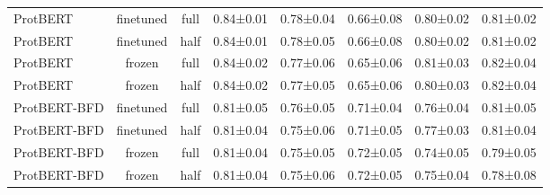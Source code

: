 \begin{tabular}{lccccccc}
    ProtBERT &      finetuned &      full & 0.84±0.01 & 0.78±0.04 & 0.66±0.08 & 0.80±0.02 & 0.81±0.02 \\
    ProtBERT &      finetuned &      half & 0.84±0.01 & 0.78±0.05 & 0.66±0.08 & 0.80±0.02 & 0.81±0.02 \\
    ProtBERT &         frozen &      full & 0.84±0.02 & 0.77±0.06 & 0.65±0.06 & 0.81±0.03 & 0.82±0.04 \\
    ProtBERT &         frozen &      half & 0.84±0.02 & 0.77±0.05 & 0.65±0.06 & 0.80±0.03 & 0.82±0.04 \\
ProtBERT-BFD &      finetuned &      full & 0.81±0.05 & 0.76±0.05 & 0.71±0.04 & 0.76±0.04 & 0.81±0.05 \\
ProtBERT-BFD &      finetuned &      half & 0.81±0.04 & 0.75±0.06 & 0.71±0.05 & 0.77±0.03 & 0.81±0.04 \\
ProtBERT-BFD &         frozen &      full & 0.81±0.04 & 0.75±0.05 & 0.72±0.05 & 0.74±0.05 & 0.79±0.05 \\
ProtBERT-BFD &         frozen &      half & 0.81±0.04 & 0.75±0.06 & 0.72±0.05 & 0.75±0.04 & 0.78±0.08 \\
\bottomrule
\end{tabular}

